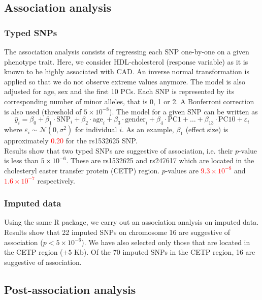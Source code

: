 \documentclass[a4paper, 12pt]{article}
\begin{document}
\subsection{Association analysis}

\subsubsection*{Typed SNPs}
The association analysis consists of regressing each SNP one-by-one on a given phenotype trait. Here, we consider HDL-cholesterol (response variable) as it is known to be highly associated with CAD. An inverse normal transformation is applied so that we do not observe extreme values anymore. The model is also adjusted for age, sex and the first 10 PCs. Each SNP is represented by its corresponding number of minor alleles, that is 0, 1 or 2. A Bonferroni correction is also used (threshold of $5 \times 10^{-8}$). The model for a given SNP can be written as 
\begin{equation*}
\hat{y}_i = \beta_0 + \beta_1 \cdot \text{SNP}_i + \beta_{2} \cdot \text{age}_i + \beta_3 \cdot \text{gender}_i + \beta_4 \cdot \text{PC1} + \ldots + \beta_{13} \cdot \text{PC10} + \varepsilon_i
\end{equation*}
where $\varepsilon_i \sim \mathcal{N}(0, \sigma^2)$ for individual $i$. As an example, $\beta_1$ (effect size) is approximately \textcolor{red}{0.20} for the rs1532625 SNP. \\

Results show that two typed SNPs are suggestive of association, i.e. their $p$-value is less than $5 \times 10^{-6}$. These are rs1532625 and rs247617 which are located in the cholesteryl easter transfer protein (CETP) region. $p$-values are \textcolor{red}{$9.3 \times 10^{-8}$} and \textcolor{red}{$1.6 \times 10^{-7}$} respectively. 

\subsubsection*{Imputed data}
Using the same R package, we carry out an association analysis on imputed data. Results show that 22 imputed SNPs on chromosome 16 are suggestive of association ($p < 5 \times 10^{-6}$). We have also selected only those that are located in the CETP region ($\pm5$ Kb). Of the 70 imputed SNPs in the CETP region, 16 are suggestive of association. 

\subsection{Post-association analysis}
\end{document}
